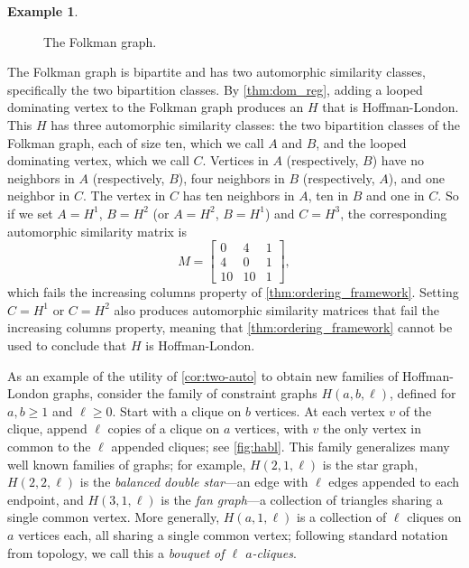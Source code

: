 \documentclass[11pt]{article}
\theoremstyle{definition}
\newtheorem{example}[theorem]{Example}
\begin{document}
\begin{example}
\begin{figure}[ht]
    \caption{The Folkman graph.} \label{fig:folkman}
\end{figure} 

The Folkman graph is bipartite and has two automorphic similarity classes, specifically the two bipartition classes. By \cref{thm:dom_reg}, adding a looped dominating vertex to the Folkman graph produces an $H$ that is Hoffman-London. This $H$ has three automorphic similarity classes: the two bipartition classes of the Folkman graph, each of size ten, which we call $A$ and $B$, and the looped dominating vertex, which we call $C$. Vertices in $A$ (respectively, $B$) have no neighbors in $A$ (respectively, $B$), four neighbors in $B$ (respectively, $A$), and one neighbor in $C$. The vertex in $C$ has ten neighbors in $A$, ten in $B$ and one in $C$. So if we set $A=H^1$, $B=H^2$ (or $A=H^2$, $B=H^1$) and $C=H^3$, the corresponding automorphic similarity matrix is 
\[
M = \begin{bmatrix}
0 & 4 & 1 \\
4 & 0 & 1 \\
10 & 10 & 1
\end{bmatrix},
\]
which fails the increasing columns property of \cref{thm:ordering_framework}. Setting $C=H^1$ or $C=H^2$ also produces automorphic similarity matrices that fail the increasing columns property, meaning that \cref{thm:ordering_framework} cannot be used to conclude that $H$ is Hoffman-London.
\end{example}

As an example of the utility of \cref{cor:two-auto} to obtain new families of Hoffman-London graphs, consider the family of constraint graphs $H(a,b,\ell)$, defined for $a, b \ge 1$ and $\ell \ge 0$. Start with a clique on $b$ vertices. At each vertex $v$ of the clique, append $\ell$ copies of a clique on $a$ vertices, with $v$ the only vertex in common to the $\ell$ appended cliques; see \cref{fig:habl}. This family generalizes many well known families of graphs; for example, $H(2,1,\ell)$ is the star graph, $H(2,2,\ell)$ is the {\it balanced double star}---an edge with $\ell$ edges appended to each endpoint, and $H(3,1,\ell)$ is the {\it fan graph}---a collection of triangles sharing a single common vertex. More generally, $H(a,1,\ell)$ is a collection of $\ell$ cliques on $a$ vertices each, all sharing a single common vertex; following standard notation from topology, we call this a {\it bouquet of $\ell$ $a$-cliques}. 
\end{document}
